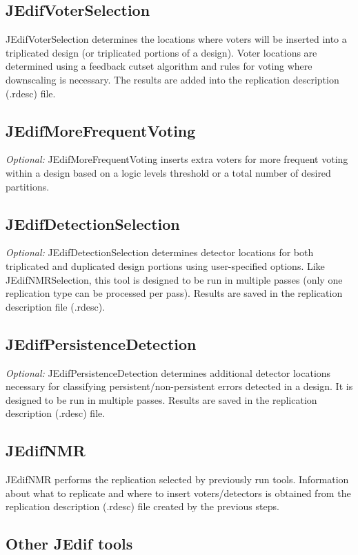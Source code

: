 \documentclass[english]{article}
\numberwithin{figure}{section}
\begin{document}
\subsection{JEdifVoterSelection}
JEdifVoterSelection determines the locations where voters will be
inserted into a triplicated design (or triplicated portions of a
design). Voter locations are determined using a feedback cutset
algorithm and rules for voting where downscaling is necessary. The
results are added into the replication description (.rdesc) file.

\subsection{JEdifMoreFrequentVoting}
\emph{Optional:} JEdifMoreFrequentVoting inserts extra voters for more frequent voting within a design based on a logic levels threshold or a total number of desired
partitions.

\subsection{JEdifDetectionSelection}
\emph{Optional:}
JEdifDetectionSelection determines detector locations for both triplicated and
duplicated design portions using user-specified options. Like
JEdifNMRSelection, this tool is designed to be run in multiple passes
(only one replication type can be processed per pass). Results are
saved in the replication description file (.rdesc).

\subsection{JEdifPersistenceDetection}
\emph{Optional:} JEdifPersistenceDetection determines additional
detector locations necessary for classifying persistent/non-persistent
errors detected in a design. It is designed to be run in multiple
passes. Results are saved in the replication description (.rdesc) file.

\subsection{JEdifNMR}
JEdifNMR performs the replication selected by previously run
tools. Information about what to replicate and where to insert
voters/detectors is obtained from the replication description (.rdesc)
file created by the previous steps.

\subsection{Other JEdif tools}
\end{document}
